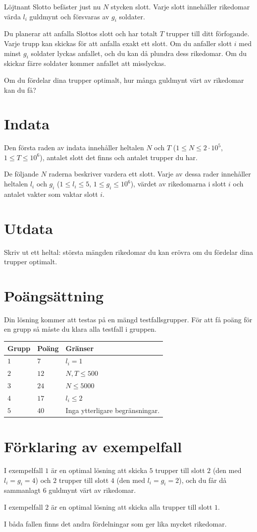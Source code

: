 Löjtnant Slotto befäster just nu $N$ stycken slott.
Varje slott innehåller rikedomar värda $l_i$ guldmynt och försvaras av $g_i$ soldater.

Du planerar att anfalla Slottos slott och har totalt $T$ trupper till ditt förfogande.
Varje trupp kan skickas för att anfalla exakt ett slott.
Om du anfaller slott $i$ med minst $g_i$ soldater lyckas anfallet, och du kan då plundra dess rikedomar.
Om du skickar färre soldater kommer anfallet att misslyckas.

Om du fördelar dina trupper optimalt, hur många guldmynt värt av rikedomar kan du få?

\section*{Indata}
Den första raden av indata innehåller heltalen $N$ och $T$ ($1 \leq N \leq 2 \cdot 10^5$, $1 \leq T \leq 10^6$),
antalet slott det finns och antalet trupper du har.

De följande $N$ raderna beskriver vardera ett slott.
Varje av dessa rader innehåller heltalen $l_i$ och $g_i$ ($1 \leq l_i \leq 5$, $1 \leq g_i \leq 10^6$),
värdet av rikedomarna i slott $i$ och antalet vakter som vaktar slott $i$.

\section*{Utdata}
Skriv ut ett heltal: största mängden rikedomar du kan erövra om du fördelar dina trupper optimalt.

\section*{Poängsättning}
Din lösning kommer att testas på en mängd testfallsgrupper.
För att få poäng för en grupp så måste du klara alla testfall i gruppen.

\noindent
\begin{tabular}{| l | l | p{12cm} |}
  \hline
  \textbf{Grupp} & \textbf{Poäng} & \textbf{Gränser} \\ \hline
  $1$    & $7$   & $l_i=1$ \\ \hline
  $2$    & $12$  & $N, T \leq 500$ \\ \hline
  $3$    & $24$  & $N \leq 5000$ \\ \hline
  $4$    & $17$  & $l_i \leq 2$ \\ \hline
  $5$    & $40$  & Inga ytterligare begränsningar. \\ \hline
\end{tabular}


\section*{Förklaring av exempelfall}
I exempelfall $1$ är en optimal lösning att skicka $5$ trupper till slott $2$ (den med $l_i=g_i=4$)
och $2$ trupper till slott $4$ (den med $l_i=g_i=2$), och du får då sammanlagt $6$ guldmynt värt av rikedomar.

I exempelfall $2$ är en optimal lösning att skicka alla trupper till slott $1$.

I båda fallen finns det andra fördelningar som ger lika mycket rikedomar.
